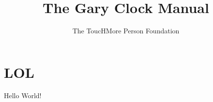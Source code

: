 \documentclass{article}
\title{The Gary Clock Manual}
\author{The ToucHMore Person Foundation}
\begin{document}
\maketitle
\section{LOL}
\label{sect:lol}
Hello World!
\end{document}
